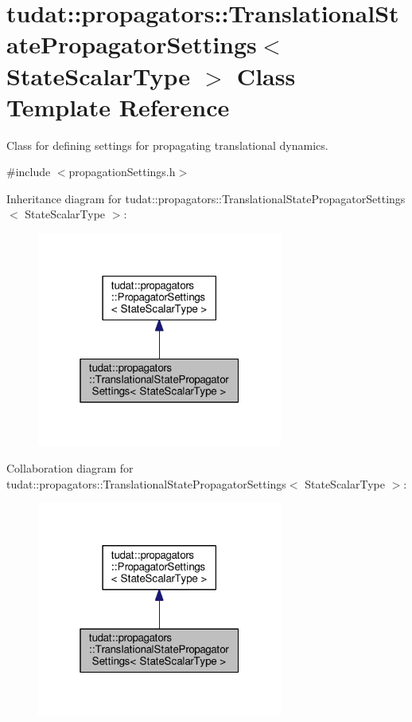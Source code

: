 \hypertarget{classtudat_1_1propagators_1_1TranslationalStatePropagatorSettings}{}\section{tudat\+:\+:propagators\+:\+:Translational\+State\+Propagator\+Settings$<$ State\+Scalar\+Type $>$ Class Template Reference}
\label{classtudat_1_1propagators_1_1TranslationalStatePropagatorSettings}


Class for defining settings for propagating translational dynamics.  




{\ttfamily \#include $<$propagation\+Settings.\+h$>$}



Inheritance diagram for tudat\+:\+:propagators\+:\+:Translational\+State\+Propagator\+Settings$<$ State\+Scalar\+Type $>$\+:
\nopagebreak
\begin{figure}[H]
\begin{center}
\leavevmode
\includegraphics[width=229pt]{classtudat_1_1propagators_1_1TranslationalStatePropagatorSettings__inherit__graph}
\end{center}
\end{figure}


Collaboration diagram for tudat\+:\+:propagators\+:\+:Translational\+State\+Propagator\+Settings$<$ State\+Scalar\+Type $>$\+:
\nopagebreak
\begin{figure}[H]
\begin{center}
\leavevmode
\includegraphics[width=229pt]{classtudat_1_1propagators_1_1TranslationalStatePropagatorSettings__coll__graph}
\end{center}
\end{figure}
